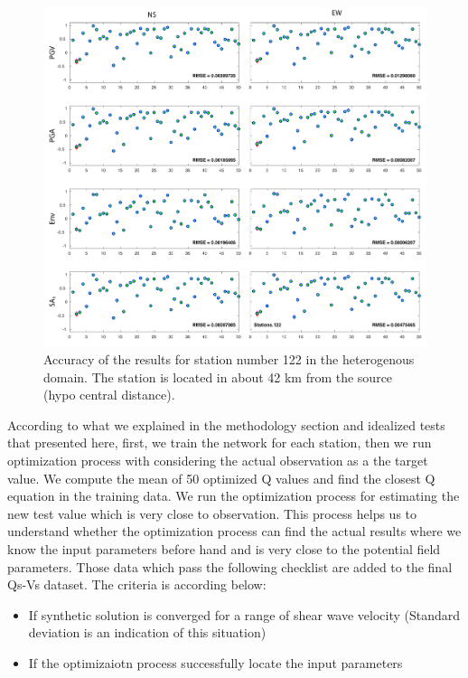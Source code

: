   \begin{figure}[ht]
    \centering
    \includegraphics[width=\textwidth]{figures/pdf/ANN_accuracy_stations_122_heterogenous_sim_177.pdf}
    \caption{Accuracy of the results for station number 122 in the heterogenous domain. The station is located in about 42 km from the source (hypo central distance).  }
    \label{fig:ANN_accuracy_stations_122_heterogenous_sim_177}
\end{figure}

According to what we explained in the methodology section and idealized tests that presented here, first, we train the network for each station, then we run optimization process with considering the actual observation as a the target value. We compute the mean of 50 optimized Q values and find the closest Q equation in the training data. We run the optimization process for estimating the new test value which is very close to observation. This process helps us to understand whether the optimization process can find the actual results where we know the input parameters before hand and is very close to the potential field parameters. Those data which pass the following checklist are added to the final Qs-Vs dataset. The criteria is according below:

\begin{itemize}
\item If synthetic solution is converged for a range of shear wave velocity (Standard deviation is an indication of this situation)
\item If the optimizaiotn process successfully locate the input parameters
\end{itemize}

